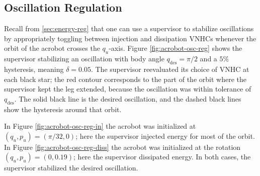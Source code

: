 \documentclass[journal,twoside,onecolumn,draftclsnofoot,web]{ieeecolor}
\begin{document}
{\subsection{Oscillation Regulation}

Recall from \ref{sec:energy-reg} that one can use a supervisor to stabilize
oscillations by appropriately toggling between injection and dissipation VNHCs
whenever the orbit of the acrobot crosses the \(q_u\)-axis.
Figure \ref{fig:acrobot-osc-reg} shows the supervisor stabilizing an
oscillation with body angle \(q_\text{des} = \pi/2\) and a 
\(5\%\) hysteresis, meaning \(\delta = 0.05\).
The supervisor reevaluated its choice of VNHC at each black star;  
the red contour corresponds to the part of the orbit where the supervisor kept
the leg extended, because the oscillation was within tolerance of
\(q_\text{des}\).
The solid black line is the desired oscillation, and the dashed black
lines show the hysteresis around that orbit.

In Figure \ref{fig:acrobot-osc-reg-in} the acrobot was initialized at 
\((q_u,p_u) = (\pi/32,0)\); here the supervisor injected energy for most of the
orbit.
In Figure \ref{fig:acrobot-osc-reg-diss} the acrobot was initialized at the rotation
\((q_u,p_u) = (0,0.19)\); here the supervisor dissipated energy. 
In both cases, the supervisor stabilized the desired oscillation.

}
\end{document}
